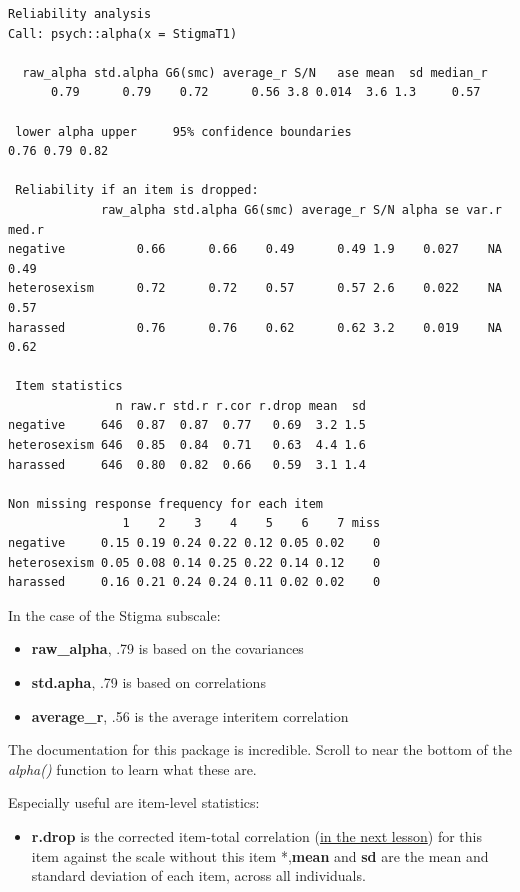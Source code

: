 \documentclass[
  english,
]{book}
\providecommand{\tightlist}{%
  \setlength{\itemsep}{0pt}\setlength{\parskip}{0pt}}
\begin{document}
\begin{verbatim}
Reliability analysis   
Call: psych::alpha(x = StigmaT1)

  raw_alpha std.alpha G6(smc) average_r S/N   ase mean  sd median_r
      0.79      0.79    0.72      0.56 3.8 0.014  3.6 1.3     0.57

 lower alpha upper     95% confidence boundaries
0.76 0.79 0.82 

 Reliability if an item is dropped:
             raw_alpha std.alpha G6(smc) average_r S/N alpha se var.r med.r
negative          0.66      0.66    0.49      0.49 1.9    0.027    NA  0.49
heterosexism      0.72      0.72    0.57      0.57 2.6    0.022    NA  0.57
harassed          0.76      0.76    0.62      0.62 3.2    0.019    NA  0.62

 Item statistics 
               n raw.r std.r r.cor r.drop mean  sd
negative     646  0.87  0.87  0.77   0.69  3.2 1.5
heterosexism 646  0.85  0.84  0.71   0.63  4.4 1.6
harassed     646  0.80  0.82  0.66   0.59  3.1 1.4

Non missing response frequency for each item
                1    2    3    4    5    6    7 miss
negative     0.15 0.19 0.24 0.22 0.12 0.05 0.02    0
heterosexism 0.05 0.08 0.14 0.25 0.22 0.14 0.12    0
harassed     0.16 0.21 0.24 0.24 0.11 0.02 0.02    0
\end{verbatim}

In the case of the Stigma subscale:

\begin{itemize}
\tightlist
\item
  \textbf{raw\_alpha}, .79 is based on the covariances
\item
  \textbf{std.apha}, .79 is based on correlations
\item
  \textbf{average\_r}, .56 is the average interitem correlation
\end{itemize}

The documentation for this package is incredible. Scroll to near the bottom of the \emph{alpha()} function to learn what these are.

Especially useful are item-level statistics:

\begin{itemize}
\tightlist
\item
  \textbf{r.drop} is the corrected item-total correlation (\protect\hyperlink{ItemAnalSurvey}{in the next lesson}) for this item against the scale without this item
  *,\textbf{mean} and \textbf{sd} are the mean and standard deviation of each item, across all individuals.
\end{itemize}
\end{document}
